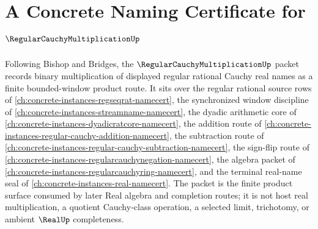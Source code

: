 \chapter{A Concrete Naming Certificate for $\RegularCauchyMultiplicationUp$}
\label{ch:concrete-instances-regular-cauchy-multiplication-namecert}

Following Bishop and Bridges, the $\RegularCauchyMultiplicationUp$ packet records binary multiplication of displayed regular rational Cauchy real names as a finite bounded-window product route. It sits over the regular rational source rows of \autoref{ch:concrete-instances-regseqrat-namecert}, the synchronized window discipline of \autoref{ch:concrete-instances-streamname-namecert}, the dyadic arithmetic core of \autoref{ch:concrete-instances-dyadicratcore-namecert}, the addition route of \autoref{ch:concrete-instances-regular-cauchy-addition-namecert}, the subtraction route of \autoref{ch:concrete-instances-regular-cauchy-subtraction-namecert}, the sign-flip route of \autoref{ch:concrete-instances-regularcauchynegation-namecert}, the algebra packet of \autoref{ch:concrete-instances-regularcauchyring-namecert}, and the terminal real-name seal of \autoref{ch:concrete-instances-real-namecert}. The packet is the finite product surface consumed by later Real algebra and completion routes; it is not host real multiplication, a quotient Cauchy-class operation, a selected limit, trichotomy, or ambient $\RealUp$ completeness.

